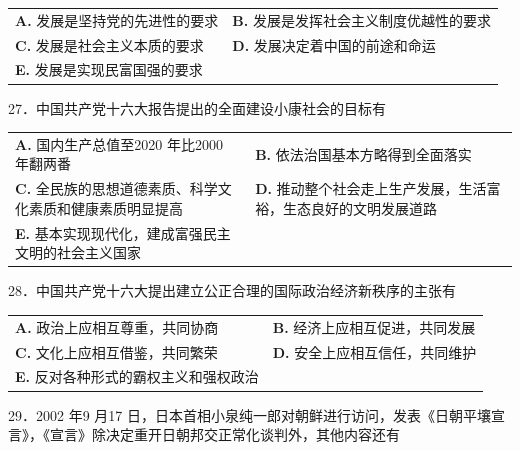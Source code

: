 \documentclass[UTF8,11pt]{ctexart}
\begin{document}
\begin{center}\begin{tabular}{>{\raggedright\arraybackslash}p{\dimexpr(\linewidth-4\tabcolsep)/2\relax}>{\raggedright\arraybackslash}p{\dimexpr(\linewidth-4\tabcolsep)/2\relax}}
\textbf{A.} 发展是坚持党的先进性的要求 & \textbf{B.} 发展是发挥社会主义制度优越性的要求\\[.35em]
\textbf{C.} 发展是社会主义本质的要求 & \textbf{D.} 发展决定着中国的前途和命运\\[.35em]
\textbf{E.} 发展是实现民富国强的要求 & \\[.35em]\end{tabular}\end{center}

27．中国共产党十六大报告提出的全面建设小康社会的目标有


\begin{center}\begin{tabular}{>{\raggedright\arraybackslash}p{\dimexpr(\linewidth-4\tabcolsep)/2\relax}>{\raggedright\arraybackslash}p{\dimexpr(\linewidth-4\tabcolsep)/2\relax}}
\textbf{A.} 国内生产总值至2020 年比2000 年翻两番 & \textbf{B.} 依法治国基本方略得到全面落实\\[.35em]
\textbf{C.} 全民族的思想道德素质、科学文化素质和健康素质明显提高 & \textbf{D.} 推动整个社会走上生产发展，生活富裕，生态良好的文明发展道路\\[.35em]
\textbf{E.} 基本实现现代化，建成富强民主文明的社会主义国家 & \\[.35em]\end{tabular}\end{center}

28．中国共产党十六大提出建立公正合理的国际政治经济新秩序的主张有


\begin{center}\begin{tabular}{>{\raggedright\arraybackslash}p{\dimexpr(\linewidth-4\tabcolsep)/2\relax}>{\raggedright\arraybackslash}p{\dimexpr(\linewidth-4\tabcolsep)/2\relax}}
\textbf{A.} 政治上应相互尊重，共同协商 & \textbf{B.} 经济上应相互促进，共同发展\\[.35em]
\textbf{C.} 文化上应相互借鉴，共同繁荣 & \textbf{D.} 安全上应相互信任，共同维护\\[.35em]
\textbf{E.} 反对各种形式的霸权主义和强权政治 & \\[.35em]\end{tabular}\end{center}

29．2002 年9 月17 日，日本首相小泉纯一郎对朝鲜进行访问，发表《日朝平壤宣言》，《宣言》除决定重开日朝邦交正常化谈判外，其他内容还有
\end{document}
